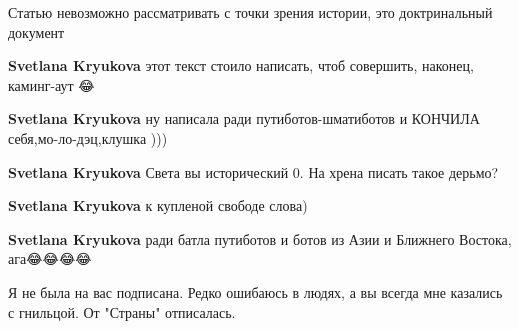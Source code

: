 \begin{itemize}
\begin{itemize}
Статью невозможно рассматривать с точки зрения истории, это доктринальный документ

 
\textbf{Svetlana Kryukova} этот текст стоило написать, чтоб совершить, наконец, каминг-аут 😂

 
\textbf{Svetlana Kryukova} ну написала ради путиботов-шматиботов и КОНЧИЛА себя,мо-ло-дэц,клушка )))

 
\textbf{Svetlana Kryukova} Света вы исторический 0. На хрена писать такое дерьмо?

 
\textbf{Svetlana Kryukova} к купленой свободе слова)

 
\textbf{Svetlana Kryukova} ради батла путиботов и ботов из Азии и Ближнего Востока, ага😂😂😂😂

 
Я не была на вас подписана. Редко ошибаюсь в людях, а вы всегда мне казались с гнильцой. От "Страны" отписалась.

 

\end{itemize}
\end{itemize}
